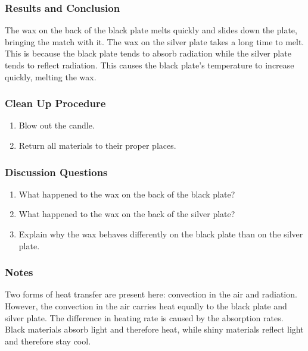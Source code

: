 \subsubsection*{Results and Conclusion}
The wax on the back of the black plate melts quickly and slides down the plate, bringing the match with it.  The wax on the silver plate takes a long time to melt.  This is because the black plate tends to absorb radiation while the silver plate tends to reflect radiation.  This causes the black plate's temperature to increase quickly, melting the wax.

\subsubsection*{Clean Up Procedure}
\begin{enumerate}
\item{Blow out the candle.}
\item{Return all materials to their proper places.}
\end{enumerate}

\subsubsection*{Discussion Questions}
\begin{enumerate}
\item{What happened to the wax on the back of the black plate?}
\item{What happened to the wax on the back of the silver plate?}
\item{Explain why the wax behaves differently on the black plate than on the silver plate.}
\end{enumerate}

\subsubsection*{Notes}
Two forms of heat transfer are present here: convection in the air and radiation.  However, the convection in the air carries heat equally to the black plate and silver plate.  The difference in heating rate is caused by the absorption rates.  Black materials absorb light and therefore heat, while shiny materials reflect light and therefore stay cool.
